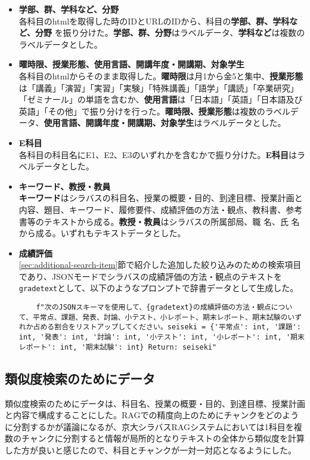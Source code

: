 \begin{itemize}
  \item \textbf{学部、群、学科など、分野} \\
  各科目のhtmlを取得した時のIDとURLのIDから、科目の\textbf{学部、群、学科など、分野} を振り分けた。\textbf{学部、群、分野}はラベルデータ、\textbf{学科など}は複数のラベルデータとした。

  \item \textbf{曜時限、授業形態、使用言語、開講年度・開講期、対象学生}\\
  各科目のhtmlからそのまま取得した。\textbf{曜時限}は月1から金5と集中、\textbf{授業形態}は「講義」「演習」「実習」「実験」「特殊講義」「語学」「講読」「卒業研究」「ゼミナール」の単語を含むか、\textbf{使用言語}は「日本語」「英語」「日本語及び英語」「その他」で振り分けを行った。\textbf{曜時限、授業形態}は複数のラベルデータ、\textbf{使用言語、開講年度・開講期、対象学生}はラベルデータとした。

  \item \textbf{E科目}\\
  各科目の科目名にE1、E2、E3のいずれかを含むかで振り分けた。\textbf{E科目}はラベルデータとした。

  \item \textbf{キーワード、教授・教員}\\
  \textbf{キーワード}はシラバスの科目名、授業の概要・目的、到達目標、授業計画と内容、題目、キーワード、履修要件、成績評価の方法・観点、教科書、参考書等のテキストから成る。\textbf{教授・教員}はシラバスの所属部局、職 名、氏 名から成る。いずれもテキストデータとした。

  \item \textbf{成績評価}\\
  \ref{sec:additional-search-item}節で紹介した追加した絞り込みのための検索項目であり、JSONモードでシラバスの成績評価の方法・観点のテキストを\texttt{gradetext}として、以下のようなプロンプトで辞書データとして生成した。

  \begin{verbatim}
    f"次のJSONスキーマを使用して、{gradetext}の成績評価の方法・観点について、平常点、課題、発表、討論、小テスト、小レポート、期末レポート、期末試験のいずれか占める割合をリストアップしてください。seiseki = {'平常点': int, '課題': int, '発表': int, '討論': int, '小テスト': int, '小レポート': int, '期末レポート': int, '期末試験': int} Return: seiseki"
  \end{verbatim}
\end{itemize}

\subsection{類似度検索のためにデータ}
類似度検索のためにデータは、科目名、授業の概要・目的、到達目標、授業計画と内容で構成することにした。RAGでの精度向上のためにチャンクをどのように分割するかが議論になるが、京大シラバスRAGシステムにおいては1科目を複数のチャンクに分割すると情報が局所的となりテキストの全体から類似度を計算した方が良いと感じたので、科目とチャンクが一対一対応となるようにした。


